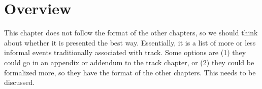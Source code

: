 \chapter{Overview}

\begin{framed}
This chapter does not follow the format of the other chapters, so we should think about whether it is presented the best way.  Essentially, it is a list of more or less informal events traditionally associated with track. Some options are (1) they could go in an appendix or addendum to the track chapter, or (2) they could be formalized more, so they have the format of the other chapters.  This needs to be discussed.
\end{framed}